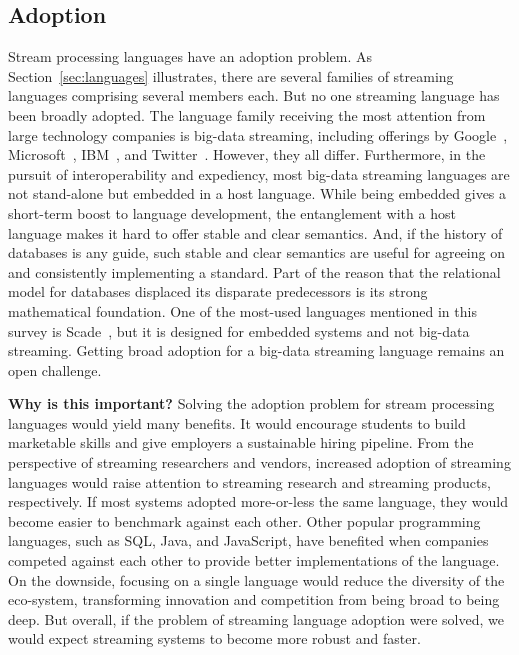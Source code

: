 \subsection{Adoption}\label{sec:adoption} %

Stream processing languages have an adoption problem. As
Section~\ref{sec:languages} illustrates, there are several families of
streaming languages comprising several members each.  But no one
streaming language has been broadly adopted. The language family
receiving the most attention from large technology companies is
big-data streaming, including offerings by
Google~\cite{akidau_et_al_2013}, Microsoft~\cite{ali_et_al_2009},
IBM~\cite{hirzel_schneider_gedik_2017}, and
Twitter~\cite{toshniwal_et_al_2014}. However, they all differ.
Furthermore, in the pursuit of interoperability and expediency, most
big-data streaming languages are not stand-alone but embedded in a
host language. While being embedded gives a short-term boost to
language development, the entanglement with a host language makes it
hard to offer stable and clear semantics. And, if the history of
databases is any guide, such stable and clear semantics are useful for
agreeing on and consistently implementing a standard. Part of the
reason that the relational model for databases displaced its disparate
predecessors is its strong mathematical foundation.  One of the
most-used languages mentioned in this survey is
Scade~\cite{scade_2017}, but it is designed for embedded systems and
not big-data streaming. Getting broad adoption for a big-data
streaming language remains an open challenge.

\textbf{Why is this important?}
%
Solving the adoption problem for stream processing languages would
yield many benefits. It would encourage students to build marketable
skills and give employers a sustainable hiring pipeline. From the
perspective of streaming researchers and vendors, increased adoption
of streaming languages would raise attention to streaming research and
streaming products, respectively. If most systems adopted more-or-less
the same language, they would become easier to benchmark against each
other. Other popular programming languages, such as SQL, Java, and
JavaScript, have benefited when companies competed against each other
to provide better implementations of the language.  On the downside,
focusing on a single language would reduce the diversity of the
eco-system, transforming innovation and competition from being broad
to being deep. But overall, if the problem of streaming language
adoption were solved, we would expect streaming systems to become more
robust and faster.

